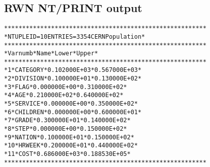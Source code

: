 \subsection*{RWN NT/PRINT output}
\begin{alltt}
             ********************************************************
             * NTUPLE ID=   10  ENTRIES=   3354   CERN Population   *
             ********************************************************
             *  Var numb  *   Name    *    Lower     *    Upper     *
             ********************************************************
             *      1     * CATEGORY  * 0.102000E+03 * 0.567000E+03 *
             *      2     * DIVISION  * 0.100000E+01 * 0.130000E+02 *
             *      3     * FLAG      * 0.000000E+00 * 0.310000E+02 *
             *      4     * AGE       * 0.210000E+02 * 0.640000E+02 *
             *      5     * SERVICE   * 0.000000E+00 * 0.350000E+02 *
             *      6     * CHILDREN  * 0.000000E+00 * 0.600000E+01 *
             *      7     * GRADE     * 0.300000E+01 * 0.140000E+02 *
             *      8     * STEP      * 0.000000E+00 * 0.150000E+02 *
             *      9     * NATION    * 0.100000E+01 * 0.150000E+02 *
             *     10     * HRWEEK    * 0.200000E+01 * 0.440000E+02 *
             *     11     * COST      * 0.686000E+03 * 0.188530E+05 *
             ********************************************************
\end{alltt} 
